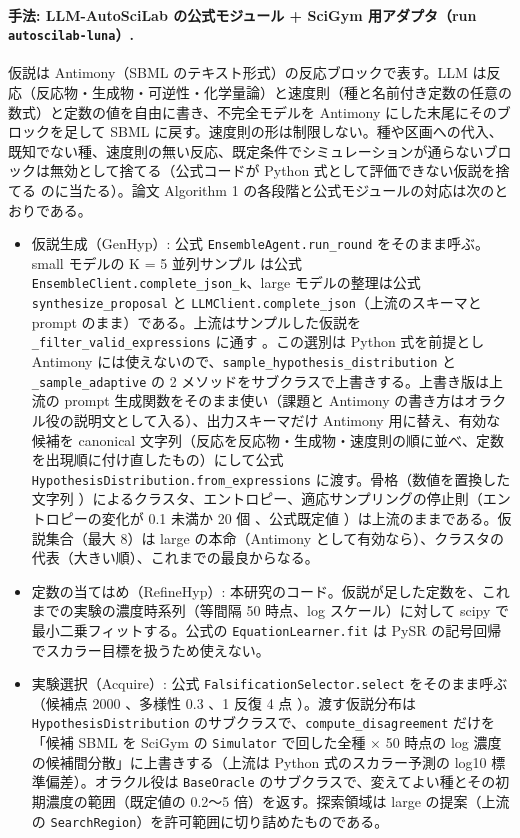 \documentclass{article}
\begin{document}
\paragraph{手法: LLM-AutoSciLab の公式モジュール + SciGym 用アダプタ（run \texttt{autoscilab-luna}）.}
仮説は Antimony（SBML のテキスト形式）の反応ブロックで表す。LLM は反応（反応物・生成物・可逆性・化学量論）と速度則（種と名前付き定数の任意の数式）と定数の値を自由に書き、不完全モデルを Antimony にした末尾にそのブロックを足して SBML に戻す。速度則の形は制限しない。種や区画への代入、既知でない種、速度則の無い反応、既定条件でシミュレーションが通らないブロックは無効として捨てる（公式コードが Python 式として評価できない仮説を捨てる \cite[s2.p29]{kabra-2026-llm} のに当たる）。論文 Algorithm 1 の各段階と公式モジュールの対応は次のとおりである。
\begin{itemize}
\item 仮説生成（GenHyp）: 公式 \texttt{EnsembleAgent.run\_round} \cite[s2.p26]{kabra-2026-llm} をそのまま呼ぶ。small モデルの K = 5 並列サンプル \cite[s2.p9]{kabra-2026-llm} は公式 \texttt{EnsembleClient.complete\_json\_k}、large モデルの整理は公式 \texttt{synthesize\_proposal} \cite[s2.p37]{kabra-2026-llm} と \texttt{LLMClient.complete\_json}（上流のスキーマと prompt のまま）である。上流はサンプルした仮説を \texttt{\_filter\_valid\_expressions} に通す \cite[s2.p29]{kabra-2026-llm}。この選別は Python 式を前提とし Antimony には使えないので、\texttt{sample\_hypothesis\_distribution} と \texttt{\_sample\_adaptive} の 2 メソッドをサブクラスで上書きする。上書き版は上流の prompt 生成関数をそのまま使い（課題と Antimony の書き方はオラクル役の説明文として入る）、出力スキーマだけ Antimony 用に替え、有効な候補を canonical 文字列（反応を反応物・生成物・速度則の順に並べ、定数を出現順に付け直したもの）にして公式 \texttt{HypothesisDistribution.from\_expressions} \cite[s2.p27]{kabra-2026-llm} に渡す。骨格（数値を置換した文字列 \cite[s2.p28]{kabra-2026-llm}）によるクラスタ、エントロピー、適応サンプリングの停止則（エントロピーの変化が 0.1 未満か 20 個 \cite[s2.p10]{kabra-2026-llm}、公式既定値 \cite[s2.p30, s2.p31]{kabra-2026-llm}）は上流のままである。仮説集合（最大 8）は large の本命（Antimony として有効なら）、クラスタの代表（大きい順）、これまでの最良からなる。
\item 定数の当てはめ（RefineHyp）: 本研究のコード。仮説が足した定数を、これまでの実験の濃度時系列（等間隔 50 時点、log スケール）に対して scipy で最小二乗フィットする。公式の \texttt{EquationLearner.fit} は PySR の記号回帰でスカラー目標を扱うため使えない。
\item 実験選択（Acquire）: 公式 \texttt{FalsificationSelector.select} \cite[s2.p22]{kabra-2026-llm} をそのまま呼ぶ（候補点 2000 \cite[s2.p15]{kabra-2026-llm}、多様性 0.3 \cite[s2.p16]{kabra-2026-llm}、1 反復 4 点 \cite[s2.p19]{kabra-2026-llm}）。渡す仮説分布は \texttt{HypothesisDistribution} のサブクラスで、\texttt{compute\_disagreement} だけを「候補 SBML を SciGym の \texttt{Simulator} で回した全種 × 50 時点の log 濃度の候補間分散」に上書きする（上流は Python 式のスカラー予測の log10 標準偏差）。オラクル役は \texttt{BaseOracle} のサブクラスで、変えてよい種とその初期濃度の範囲（既定値の 0.2〜5 倍）を返す。探索領域は large の提案（上流の \texttt{SearchRegion}）を許可範囲に切り詰めたものである。

\end{itemize}
\end{document}
